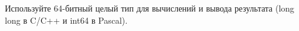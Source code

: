 Используйте 64-битный целый тип для вычислений и вывода результата (long long в
C/C++ и int64 в Pascal). 